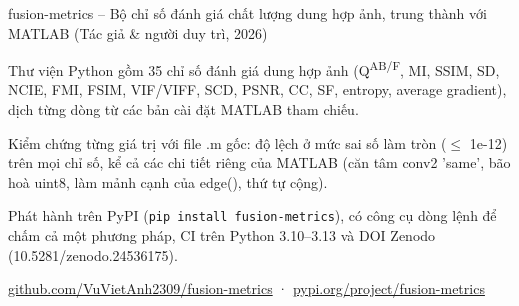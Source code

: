 
\begin{cventries}

  \cventry
    {fusion-metrics -- Bộ chỉ số đánh giá chất lượng dung hợp ảnh, trung thành với MATLAB (Tác giả \& người duy trì, 2026)}
    {}
    {
      \begin{cvitems}
        \item {Thư viện Python gồm 35 chỉ số đánh giá dung hợp ảnh (Q\textsuperscript{AB/F}, MI, SSIM, SD, NCIE, FMI, FSIM, VIF/VIFF, SCD, PSNR, CC, SF, entropy, average gradient), dịch từng dòng từ các bản cài đặt MATLAB tham chiếu.}
        \item {Kiểm chứng từng giá trị với file .m gốc: độ lệch ở mức sai số làm tròn ($\leq$ 1e-12) trên mọi chỉ số, kể cả các chi tiết riêng của MATLAB (căn tâm conv2 'same', bão hoà uint8, làm mảnh cạnh của edge(), thứ tự cộng).}
        \item {Phát hành trên PyPI (\texttt{pip install fusion-metrics}), có công cụ dòng lệnh để chấm cả một phương pháp, CI trên Python 3.10--3.13 và DOI Zenodo (10.5281/zenodo.24536175).}
        \item {\href{https://github.com/VuVietAnh2309/fusion-metrics}{github.com/VuVietAnh2309/fusion-metrics} · \href{https://pypi.org/project/fusion-metrics/}{pypi.org/project/fusion-metrics}}
      \end{cvitems}
    }

\end{cventries}
